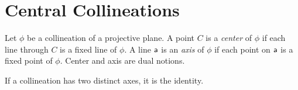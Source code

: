 \section{Central Collineations}

\begin{defn}
    Let\/ $\phi$ be a collineation of a projective plane. A point\/ $C$ is a \textsl{center} of\/ $\phi$ if each line through\/ $C$ is a fixed line of\/ $\phi$. A line\/ $\mathsf a$ is an \textsl{axis} of\/ $\phi$ if each point on\/ $\mathsf a$ is a fixed point of\/ $\phi$. Center and axis are dual notions.
\end{defn}


\begin{lem}\label{lem:unique-axis-center}
    If a collineation has two distinct axes, it is the identity.
\end{lem}


